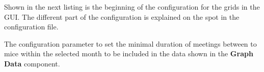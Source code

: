 \documentclass[a4paper,10pt,twoside,headings=small,bibliography=totocnumbered,headsepline]{scrartcl}
\begin{document}
\begin{appendix}
Shown in the next listing is the beginning of the configuration for the grids in the GUI. The different part of the configuration is explained on the spot in the configuration file.



The configuration parameter to set the minimal duration of meetings between to mice within the selected month to be included in the data shown in the \textbf{Graph Data} component. 



\newpage


\end{appendix}
\end{document}

